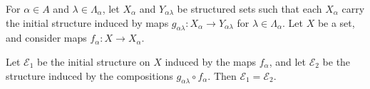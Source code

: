 \documentclass[article, a4paper, 11pt, oneside]{memoir}
\numberwithin{equation}{chapter}
\newcommand{\calE}{\mathcal{E}}
\newcommand{\calF}{\mathcal{F}}
\DeclarePairedDelimiter{\gen}{\langle}{\rangle} %
\newcommand{\preim}{^{-1}}
\begin{document}
\begin{proposition}
    \label{thm:composition_initial_structures}
    For $\alpha \in A$ and $\lambda \in \Lambda_\alpha$, let $X_\alpha$ and $Y_{\alpha\lambda}$ be structured sets such that each $X_\alpha$ carry the initial structure induced by maps $g_{\alpha\lambda} \colon X_\alpha \to Y_{\alpha\lambda}$ for $\lambda \in \Lambda_\alpha$. Let $X$ be a set, and consider maps $f_\alpha \colon X \to X_\alpha$.

    Let $\calE_1$ be the initial structure on $X$ induced by the maps $f_\alpha$, and let $\calE_2$ be the structure induced by the compositions $g_{\alpha\lambda} \circ f_\alpha$. Then $\calE_1 = \calE_2$.
    
\end{proposition}

\end{document}
